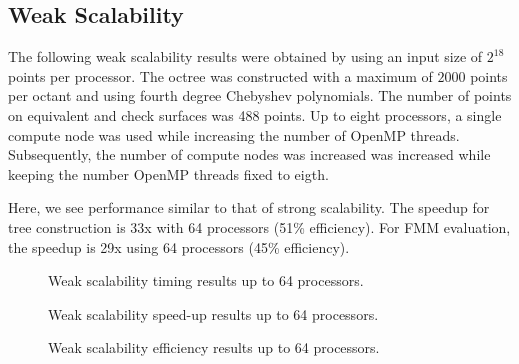 \documentclass[11pt]{article}
\begin{document}
\subsection{Weak Scalability}
The following weak scalability results were obtained by using an input size of 
$2^{18}$ points per processor. The octree was constructed with a maximum of 
$2000$ points per octant and using fourth degree Chebyshev polynomials. The 
number of points on equivalent and check surfaces was 488 points.
Up to eight processors, a single compute node was used while increasing the 
number of OpenMP threads. Subsequently, the number of compute nodes was 
increased was increased while keeping the number OpenMP threads fixed to eigth.

Here, we see performance similar to that of strong scalability. The speedup for
tree construction is 33x with 64 processors (51\% efficiency). For FMM 
evaluation, the speedup is 29x using 64 processors (45\% efficiency). 

\begin{figure}[H]
\centering
\caption{Weak scalability timing results up to 64 processors.}
\end{figure}

\begin{figure}[H]
\centering
\caption{Weak scalability speed-up results up to 64 processors.}
\end{figure}

\begin{figure}[H]
\centering
\caption{Weak scalability efficiency results up to 64 processors.}
\end{figure}




\end{document}
